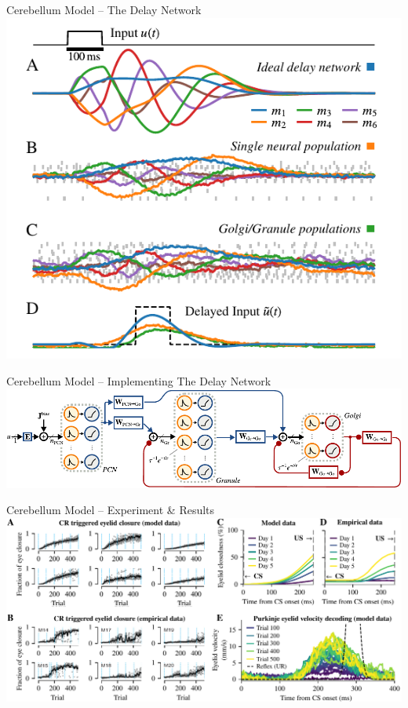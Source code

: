 \documentclass[handout,aspectratio=169]{beamer}
\begin{document}
	\begin{frame}{Cerebellum Model -- The Delay Network}
		\centering
		\includegraphics[height=0.8\textheight]{media/delay_network_response.pdf}
	\end{frame}
	
	\begin{frame}{Cerebellum Model -- Implementing The Delay Network}
		\includegraphics[width=\textwidth]{media/delay_network_dale.pdf}
	\end{frame}
	
	\begin{frame}{Cerebellum Model -- Experiment \& Results}
		\includegraphics[width=\textwidth]{media/results_panel.pdf}
	\end{frame}
\end{document}
